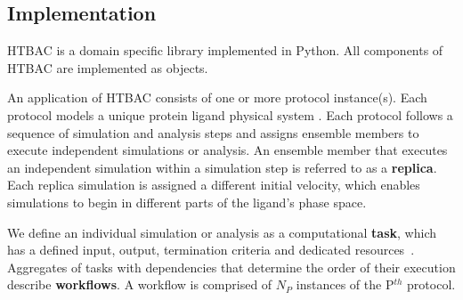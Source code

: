 

\subsection{Implementation}


HTBAC is a domain specific library implemented in Python. All components of
HTBAC are implemented as objects. 


An application of HTBAC consists of one or more protocol
instance(s). Each protocol models a unique protein ligand physical system
.
Each protocol follows a sequence of simulation and analysis steps and assigns
ensemble members to execute independent simulations or analysis. An ensemble
member that executes an independent simulation within a simulation step is
referred to as a \textbf{replica}. Each replica simulation is assigned a
different initial velocity, which enables simulations to begin in different
parts of the ligand's phase space.

We define an individual simulation or analysis as a computational
\textbf{task}, which has a defined input, output, termination criteria and
dedicated resources~\cite{power-of-many17}. Aggregates of tasks with
dependencies that determine the order of their execution describe
\textbf{workflows}. A workflow is comprised of $N_P$ instances of the
P$^{th}$ protocol.

